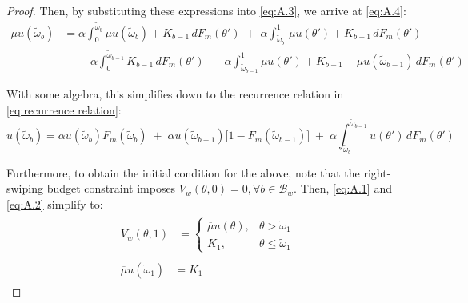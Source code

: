 \begin{proof}
Then, by substituting these expressions into \eqref{eq:A.3}, we arrive at \eqref{eq:A.4}: 
\begin{equation}\label{eq:A.4}
    \begin{split}
        \overline\mu u(\widetilde\omega_b) &=\alpha \int^{\widetilde\omega_b}_0 \overline\mu u(\widetilde\omega_b) +K_{b-1}\,dF_m(\theta') \;+\; \alpha \int^1_{\widetilde\omega_b} \,\overline\mu u(\theta') + K_{b-1}\,dF_m(\theta')\\ 
                                           & \quad -\,\alpha \int^{\widetilde\omega_{b-1}}_0 K_{b-1}\,dF_m(\theta') \;-\; \alpha \int^1_{\widetilde\omega_{b-1}} \overline\mu u(\theta') + K_{b-1}-\overline\mu u(\widetilde\omega_{b-1})\,dF_m(\theta')
    \end{split}
\end{equation}

With some algebra, this simplifies down to the recurrence relation in \autoref{eq:recurrence relation}:  
\begin{equation}
    u(\widetilde\omega_b)=\alpha   u(\widetilde\omega_b)F_m(\widetilde\omega_b) \;+\; \alpha  u(\widetilde\omega_{b-1})\Big[1  - F_m(\widetilde\omega_{b-1})\Big] \;+\; \alpha\int^{\widetilde\omega_{b-1}}_{\widetilde\omega_b} u(\theta') \,dF_m(\theta') 
\end{equation}

Furthermore, to obtain the initial condition for the above, note that the right-swiping budget constraint imposes $V_w(\theta,0)=0, \forall b\in \mathcal{B}_w$. Then, \eqref{eq:A.1} and \eqref{eq:A.2} simplify to: 
\begin{align}
    \begin{split}\label{eq:A.5} 
        V_w(\theta, 1)&=\begin{cases} 
            \overline\mu u(\theta),& \theta> \widetilde \omega_1 \\  
            K_1,& \theta\leq\widetilde \omega_1
        \end{cases}
    \end{split}\\ 
    \begin{split}\label{eq:A.6}
        \overline\mu u(\widetilde\omega_1) &= K_1 
    \end{split} 
\end{align}


\end{proof}
